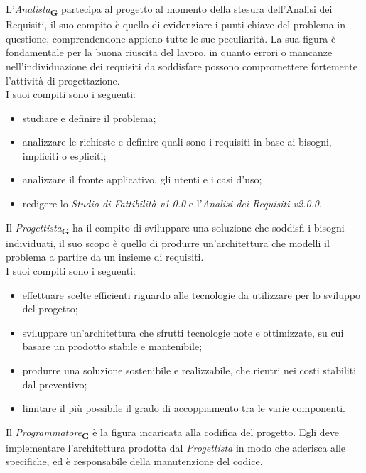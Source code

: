 L'\textit{Analista}\textsubscript{\textbf{G}} partecipa al progetto al momento della stesura dell'Analisi dei Requisiti, il suo compito è quello di evidenziare i punti chiave del problema in questione, comprendendone appieno tutte le sue peculiarità. La sua figura è fondamentale per la buona riuscita del lavoro, in quanto errori o mancanze nell'individuazione dei requisiti da soddisfare possono compromettere fortemente l'attività di progettazione.\\
I suoi compiti sono i seguenti:
\begin {itemize}

\item studiare e definire il problema;
\item analizzare le richieste e definire quali sono i requisiti in base ai bisogni, impliciti o espliciti;
\item analizzare il fronte applicativo, gli utenti e i casi d’uso;
\item redigere lo \textit{Studio di Fattibilità v1.0.0} e l’\textit{Analisi dei Requisiti v2.0.0}.

\end {itemize}
Il \textit{Progettista}\textsubscript{\textbf{G}} ha il compito di sviluppare una soluzione che soddisfi i bisogni individuati, il suo scopo è quello di produrre un'architettura che modelli il problema a partire da un insieme di requisiti.\\
I suoi compiti sono i seguenti:
\begin {itemize}
\item effettuare scelte efficienti riguardo alle tecnologie da utilizzare per lo sviluppo del progetto;
\item sviluppare un'architettura che sfrutti tecnologie note e ottimizzate, su cui basare un prodotto stabile e mantenibile;
\item produrre una soluzione sostenibile e realizzabile, che rientri nei costi stabiliti dal preventivo;
\item limitare il più possibile il grado di accoppiamento tra le varie componenti.
\end {itemize}

Il \textit{Programmatore}\textsubscript{\textbf{G}} è la figura incaricata alla codifica del progetto. Egli deve implementare l’architettura prodotta dal \textit{Progettista} in modo che aderisca alle specifiche, ed è responsabile della manutenzione del codice.\\

